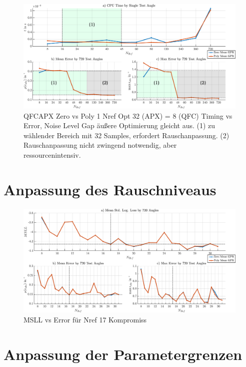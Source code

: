 \begin{figure}[tbph]
	\centering
	\includegraphics[width=\linewidth]{appendix/images/8-Ergebnisse-Experimente/Timings-vs-Errors}
	\caption[Timing vs Error]{QFCAPX Zero vs Poly 1 Nref Opt 32 (APX) = 8 (QFC) Timing vs Error, Noise Level Gap äußere Optimierung gleicht aus. (1) zu wählender Bereich mit 32 Samples, erfordert Rauschanpassung. (2) Rauschanpassung nicht zwingend notwendig, aber ressourcenintensiv.}
	\label{fig:timings-vs-errors}
\end{figure}


\clearpage


\section{Anpassung des Rauschniveaus}\label{sec:ergexp3}


\begin{figure}[tbph]
	\centering
	\includegraphics[width=\linewidth]{appendix/images/8-Ergebnisse-Experimente/MSLL-vs-Errors}
	\caption[MSLL vs Error für Nref 17]{MSLL vs Error für Nref 17 Kompromiss}
	\label{fig:msll-vs-errors}
\end{figure}


\clearpage


\section{Anpassung der Parametergrenzen}\label{sec:ergexp4}

